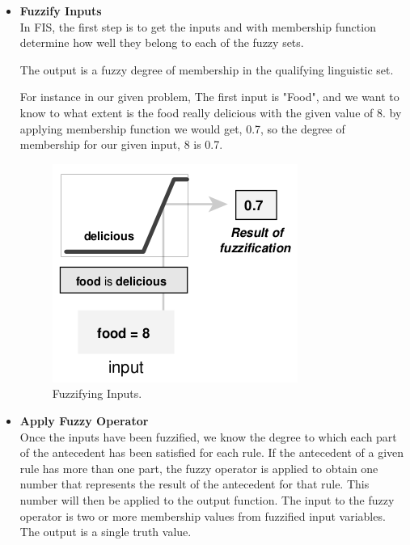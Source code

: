 \documentclass{article}
\begin{document}
\begin{itemize}
\item \textbf{Fuzzify Inputs}\\ 
In FIS, the first step is to get the inputs and with membership function determine how well they 
belong to each of the fuzzy sets.

The output is a fuzzy degree of membership in the qualifying linguistic set. 



For instance in our given problem, The first input is "Food", and we want to know
to what extent is the food really delicious with the given value of 8.
by applying membership function we would get, 0.7, so the degree of membership for 
our given input, 8  is 0.7.
\begin{figure}[H]
\begin{center}
\includegraphics[scale=0.5]{./images/fuzzify.png}
\caption{Fuzzifying Inputs.}
\label{Fuzzify}
\end{center}
\end{figure}


\item \textbf{Apply Fuzzy Operator}\\
Once the inputs have been fuzzified, we know the degree to which each part of
the antecedent has been satisfied for each rule. If the antecedent of a given rule
has more than one part, the fuzzy operator is applied to obtain one number that
represents the result of the antecedent for that rule. This number will then be
applied to the output function. The input to the fuzzy operator is two or more
membership values from fuzzified input variables. The output is a single truth
value.


\end{itemize}
\end{document}
